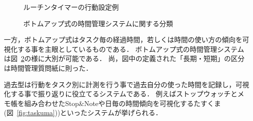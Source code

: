\begin{figure}[hb]
	\begin{center}
		\caption{ルーチンタイマーの行動設定例}
		\label{fig:routine}
	\end{center}
\end{figure}

\begin{figure}[hb]
	\begin{center}
		\caption{ボトムアップ式の時間管理システムに関する分類}
		\label{fig:bottomup}
	\end{center}
\end{figure}

一方，ボトムアップ式はタスク毎の経過時間，若しくは時間の使い方の傾向を可視化する事を主眼としているものである．
ボトムアップ式の時間管理システムは図~\ref{fig:bottomup}の様に大別が可能である．
尚，図中の定義された「長期・短期」の区分は時間管理質問紙\cite{Britton1991}に則った．

過去型は行動をタスク別に計測を行う事で過去自分の使った時間を記録し，可視化する事で振り返りに役立てるシステムである．
例えばストップウォッチとメモ帳を組み合わせたStop\&Note\cite{pomodoro}や日毎の時間傾向を可視化するたすくま\cite{Taskuma}(図~\ref{fig:taskuma}))といったシステムが挙げられる．

